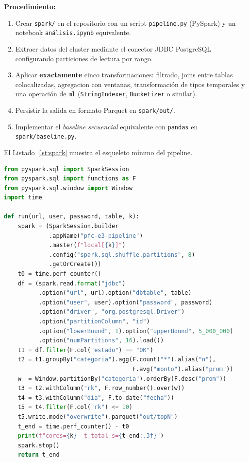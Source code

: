 \documentclass[11pt,a4paper]{article}
\begin{document}
    \textbf{Procedimiento:}
    \begin{enumerate}
        \item Crear \texttt{spark/} en el repositorio con un script \texttt{pipeline.py} (PySpark) y un notebook \texttt{análisis.ipynb} equivalente.
        \item Extraer datos del cluster mediante el conector JDBC PostgreSQL configurando particiones de lectura por rango.
        \item Aplicar \textbf{exactamente} cinco transformaciones: filtrado, joins entre tablas colocalizadas, agregacion con ventanas, transformación de tipos temporales y una operación de \texttt{ml} (\texttt{StringIndexer}, \texttt{Bucketizer} o similar).
        \item Persistir la salida en formato Parquet en \texttt{spark/out/}.
        \item Implementar el \emph{baseline secuencial} equivalente con \texttt{pandas} en \texttt{spark/baseline.py}.
    \end{enumerate}
    El Listado~\ref{lst:spark} muestra el esqueleto mínimo del pipeline.
    \begin{lstlisting}[language=Python,caption={Esqueleto de \texttt{spark/pipeline.py}.},label={lst:spark}]
from pyspark.sql import SparkSession
from pyspark.sql import functions as F
from pyspark.sql.window import Window
import time

def run(url, user, password, table, k):
    spark = (SparkSession.builder
             .appName("pfc-e3-pipeline")
             .master(f"local[{k}]")
             .config("spark.sql.shuffle.partitions", 8)
             .getOrCreate())
    t0 = time.perf_counter()
    df = (spark.read.format("jdbc")
          .option("url", url).option("dbtable", table)
          .option("user", user).option("password", password)
          .option("driver", "org.postgresql.Driver")
          .option("partitionColumn", "id")
          .option("lowerBound", 1).option("upperBound", 5_000_000)
          .option("numPartitions", 16).load())
    t1 = df.filter(F.col("estado") == "OK")
    t2 = t1.groupBy("categoria").agg(F.count("*").alias("n"),
                                     F.avg("monto").alias("prom"))
    w  = Window.partitionBy("categoria").orderBy(F.desc("prom"))
    t3 = t2.withColumn("rk", F.row_number().over(w))
    t4 = t3.withColumn("dia", F.to_date("fecha"))
    t5 = t4.filter(F.col("rk") <= 10)
    t5.write.mode("overwrite").parquet("out/topN")
    t_end = time.perf_counter() - t0
    print(f"cores={k}  t_total_s={t_end:.3f}")
    spark.stop()
    return t_end
    \end{lstlisting}
\end{document}
